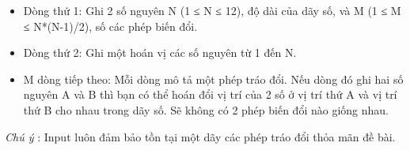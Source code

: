 \begin{itemize}
	\item     Dòng thứ 1: Ghi 2 số nguyên N (1 ≤ N ≤ 12), độ dài của dãy số, và M (1 ≤ M ≤ N*(N-1)/2), số các phép biến đổi.   
\end{itemize}
\begin{itemize}
	\item     Dòng thứ 2: Ghi một hoán vị các số nguyên từ 1 đến N.   
	\item     M dòng tiếp theo: Mỗi dòng mô tả một phép tráo đổi. Nếu dòng đó ghi hai số nguyên A và B thì bạn có thể hoán đổi vị trí của 2 số ở vị trí thứ A và vị trí thứ B cho nhau trong dãy số. Sẽ không có 2 phép biến đổi nào giống nhau.   
\end{itemize}

\emph{    Chú ý   }   : Input luôn đảm bảo tồn tại một dãy các phép tráo đổi thỏa mãn đề bài.